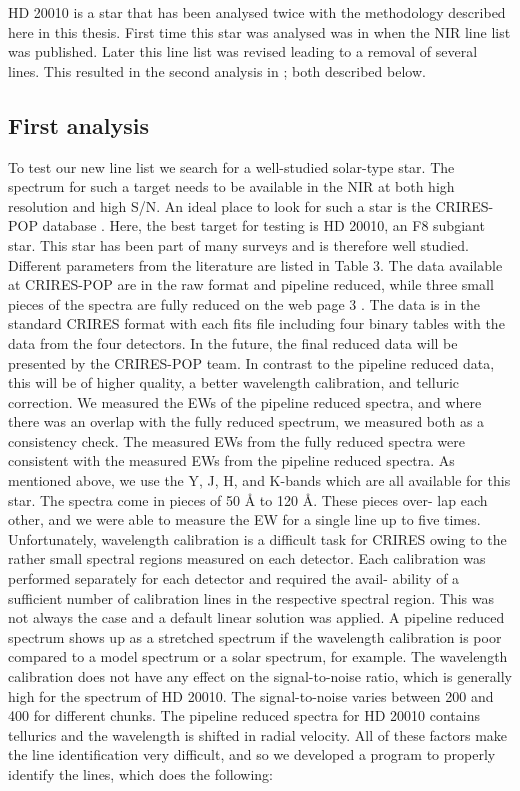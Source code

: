 HD 20010 is a star that has been analysed twice with the methodology described here in this thesis.
First time this star was analysed was in \citet{Andreasen2016} when the NIR line list was published.
Later this line list was revised leading to a removal of several lines. This resulted in the second
analysis in \citet{Andreasen2017b}; both described below.

\subsection{First analysis}

To test our new line list we search for a well-studied solar-type star. The spectrum for such a
target needs to be available in the NIR at both high resolution and high S/N. An ideal place to look
for such a star is the CRIRES-POP database \citep{Lebzelter2012}. Here, the best target for testing
is HD 20010, an F8 subgiant star. This star has been part of many surveys and is therefore well
studied. Different parameters from the literature are listed in Table 3. The data available at
CRIRES-POP are in the raw format and pipeline reduced, while three small pieces of the spectra are
fully reduced on the web page 3 . The data is in the standard CRIRES format with each fits file
including four binary tables with the data from the four detectors. In the future, the final reduced
data will be presented by the CRIRES-POP team. In contrast to the pipeline reduced data, this will
be of higher quality, a better wavelength calibration, and telluric correction. We measured the EWs
of the pipeline reduced spectra, and where there was an overlap with the fully reduced spectrum, we
measured both as a consistency check. The measured EWs from the fully reduced spectra were
consistent with the measured EWs from the pipeline reduced spectra. As mentioned above, we use the
Y, J, H, and K-bands which are all available for this star. The spectra come in pieces of 50 Å to
120 Å. These pieces over- lap each other, and we were able to measure the EW for a single line up to
five times. Unfortunately, wavelength calibration is a difficult task for CRIRES owing to the rather
small spectral regions measured on each detector. Each calibration was performed separately for each
detector and required the avail- ability of a sufficient number of calibration lines in the
respective spectral region. This was not always the case and a default linear solution was applied.
A pipeline reduced spectrum shows up as a stretched spectrum if the wavelength calibration is poor
compared to a model spectrum or a solar spectrum, for example. The wavelength calibration does not
have any effect on the signal-to-noise ratio, which is generally high for the spectrum of HD 20010.
The signal-to-noise varies between 200 and 400 for different chunks. The pipeline reduced spectra
for HD 20010 contains tellurics and the wavelength is shifted in radial velocity. All of these
factors make the line identification very difficult, and so we developed a program to properly
identify the lines, which does the following:

